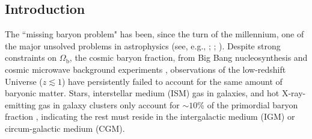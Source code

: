 \documentclass[twocolumn]{aastex63}
\begin{document}
\begin{CJK*}{UTF8}{gbsn}

\section{Introduction} \label{sec:intro}
The ``missing baryon problem" has been, since the turn of the millennium, one of the major unsolved problems in astrophysics (see, e.g., 
\citealt{fukugita:2004}; \citealt{cen:2006}; \citealt{bregman:2007}).
Despite strong constraints on $\Omega_\mathrm{b}$, the cosmic baryon fraction, from Big Bang nucleosynthesis and cosmic microwave
background experiments \citep{planck-collaboration:2020}, observations of the low-redshift Universe ($z \lesssim 1$) have persistently failed to account for the same amount
of baryonic matter. Stars, interstellar medium (ISM) gas in galaxies, and hot X-ray-emitting gas in galaxy clusters only account for $\sim 10\%$ of the
primordial baryon fraction \citep[e.g.,][]{persic:1992,fukugita:1998}, indicating the rest must reside in the intergalactic medium (IGM) or circum-galactic medium (CGM). 


\end{CJK*}
\end{document}

